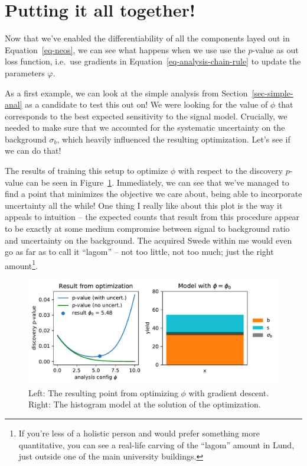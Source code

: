 \documentclass[
  11pt,
  numbers=noendperiod]{book}
\begin{document}
\hypertarget{putting-it-all-together}{%
\section{Putting it all together!}\label{putting-it-all-together}}

Now that we've enabled the differentiability of all the components layed
out in Equation~\ref{eq-neos}, we can see what happens when we use use
the \(p\)-value as out loss function, i.e.~use gradients in
Equation~\ref{eq-analysis-chain-rule} to update the parameters
\(\varphi\).

As a first example, we can look at the simple analysis from
Section~\ref{sec-simple-anal} as a candidate to test this out on! We
were looking for the value of \(\phi\) that corresponds to the best
expected sensitivity to the signal model. Crucially, we needed to make
sure that we accounted for the systematic uncertainty on the background
\(\sigma_b\), which heavily influenced the resulting optimization. Let's
see if we can do that!

The results of training this setup to optimize \(\phi\) with respect to
the discovery \(p\)-value can be seen in Figure~\ref{fig-simple-opt}.
Immediately, we can see that we've managed to find a point that
minimizes the objective we care about, being able to incorporate
uncertainty all the while! One thing I really like about this plot is
the way it appeals to intuition -- the expected counts that result from
this procedure appear to be exactly at some medium compromise between
signal to background ratio and uncertainty on the background. The
acquired Swede within me would even go as far as to call it ``lagom'' --
not too little, not too much; just the right amount\footnote{If you're
  less of a holistic person and would prefer something more
  quantitative, you can see a real-life carving of the ``lagom'' amount
  in Lund, just outside one of the main university buildings.}.

\begin{figure}

{\centering \includegraphics{./images/opt.pdf}

}

\caption{\label{fig-simple-opt}Left: The resulting point from optimizing
\(\phi\) with gradient descent. Right: The histogram model at the
solution of the optimization.}

\end{figure}
\end{document}
